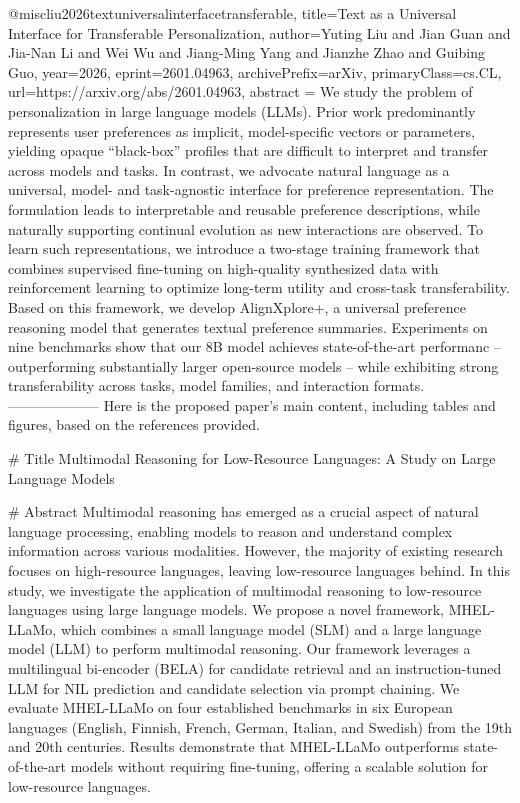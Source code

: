 {}@misc{liu2026textuniversalinterfacetransferable,
      title={Text as a Universal Interface for Transferable Personalization}, 
      author={Yuting Liu and Jian Guan and Jia-Nan Li and Wei Wu and Jiang-Ming Yang and Jianzhe Zhao and Guibing Guo},
      year={2026},
      eprint={2601.04963},
      archivePrefix={arXiv},
      primaryClass={cs.CL},
      url={https://arxiv.org/abs/2601.04963},
      abstract = {We study the problem of personalization in large language models (LLMs). Prior work predominantly represents user preferences as implicit, model-specific vectors or parameters, yielding opaque ``black-box'' profiles that are difficult to interpret and transfer across models and tasks. In contrast, we advocate natural language as a universal, model- and task-agnostic interface for preference representation. The formulation leads to interpretable and reusable preference descriptions, while naturally supporting continual evolution as new interactions are observed. To learn such representations, we introduce a two-stage training framework that combines supervised fine-tuning on high-quality synthesized data with reinforcement learning to optimize long-term utility and cross-task transferability. Based on this framework, we develop AlignXplore+, a universal preference reasoning model that generates textual preference summaries. Experiments on nine benchmarks show that our 8B model achieves state-of-the-art performanc -- outperforming substantially larger open-source models -- while exhibiting strong transferability across tasks, model families, and interaction formats.}
}
        --------------------
         Here is the proposed paper's main content, including tables and figures, based on the references provided.

        # Title
        Multimodal Reasoning for Low-Resource Languages: A Study on Large Language Models

        # Abstract
        Multimodal reasoning has emerged as a crucial aspect of natural language processing, enabling models to reason and understand complex information across various modalities. However, the majority of existing research focuses on high-resource languages, leaving low-resource languages behind. In this study, we investigate the application of multimodal reasoning to low-resource languages using large language models. We propose a novel framework, MHEL-LLaMo, which combines a small language model (SLM) and a large language model (LLM) to perform multimodal reasoning. Our framework leverages a multilingual bi-encoder (BELA) for candidate retrieval and an instruction-tuned LLM for NIL prediction and candidate selection via prompt chaining. We evaluate MHEL-LLaMo on four established benchmarks in six European languages (English, Finnish, French, German, Italian, and Swedish) from the 19th and 20th centuries. Results demonstrate that MHEL-LLaMo outperforms state-of-the-art models without requiring fine-tuning, offering a scalable solution for low-resource languages.

